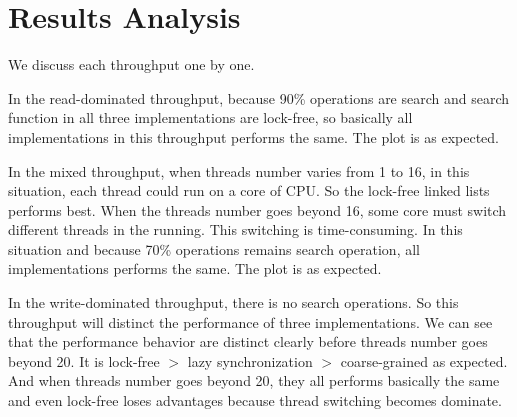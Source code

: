 \documentclass[a4paper]{report}
\begin{document}
\section*{Results Analysis}
We discuss each throughput one by one.

In the read-dominated throughput, because 90\% operations are search and search function in all three implementations are lock-free, so basically all implementations in this throughput performs the same. The plot is as expected.

In the mixed throughput, when threads number varies from 1 to 16, in this situation, each thread could run on a core of CPU. So the lock-free linked lists performs best. When the threads number goes beyond 16, some core must switch different threads in the running. This switching is time-consuming. In this situation and because 70\% operations remains search operation, all implementations performs the same. The plot is as expected.

In the write-dominated throughput, there is no search operations. So this throughput will distinct the performance of three implementations. We can see that the performance behavior are distinct clearly before threads number goes beyond 20. It is lock-free $>$ lazy synchronization $>$ coarse-grained as expected. And when threads number goes beyond 20, they all performs basically the same and even lock-free loses advantages because thread switching becomes dominate.
\end{document}
